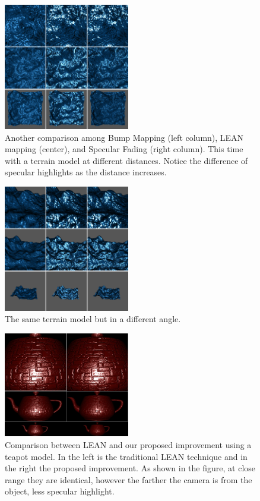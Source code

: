 \documentclass[10pt, conference]{IEEEtran}
\begin{document}
\begin{figure}[H]
	\includegraphics[width=0.49\textwidth]{figs/BLS6.png}
	\caption{Another comparison among Bump Mapping (left column), LEAN mapping (center), and Specular Fading (right column). This time with a terrain model at different distances. Notice the difference of specular highlights as the distance increases.}
	\label{fig:BLS6}
\end{figure}

\begin{figure}[H]
	\includegraphics[width=0.49\textwidth]{figs/BLS7.png}
	\caption{The same terrain model but in a different angle.}
	\label{fig:BLS7}
\end{figure}

\begin{figure}[H]
	\includegraphics[width=0.49\textwidth]{figs/LS1.png}
	\caption{Comparison between LEAN and our proposed improvement using a teapot model. In the left is the traditional LEAN technique and in the right the proposed improvement. As shown in the figure, at close range they are identical, however the farther the camera is from the object, less specular highlight.}
	\label{fig:LS1}
\end{figure}
\end{document}
